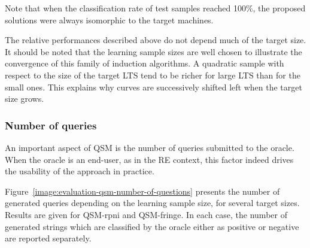 Note that when the classification rate of test samples reached 100\%, the proposed solutions were always isomorphic to the target machines.

The relative performances described above do not depend much of the target size. It should be noted that the learning sample sizes are well chosen to illustrate the convergence of this family of induction algorithms. A quadratic sample with respect to the size of the target LTS tend to be richer for large LTS than for the small ones. This explains why curves are successively shifted left when the target size grows.


\subsubsection*{Number of queries\label{subsection:evaluation-synthetic-queries-on-qsm}}

An important aspect of QSM is the number of queries submitted to the oracle. When the oracle is an end-user, as in the RE context, this factor indeed drives the usability of the approach in practice. 

Figure~\ref{image:evaluation-qsm-number-of-questions} presents the number of generated queries depending on the learning sample size, for several target sizes. Results are given for QSM-rpni and QSM-fringe. In each case, the number of generated strings which are classified by the oracle either as positive or negative are reported separately.

